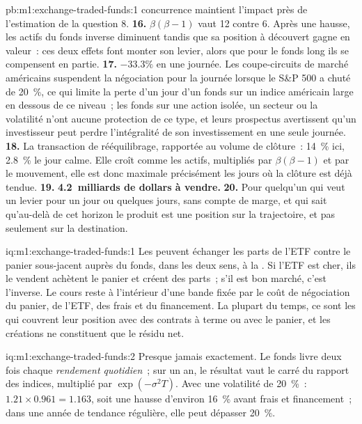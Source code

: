 \begin{solution}{pb:m1:exchange-traded-funds:1}
concurrence maintient l'impact près de l'estimation de la question 8.
\textbf{16.} $\beta(\beta-1)$ vaut 12 contre 6. Après une hausse, les actifs du fonds inverse
diminuent tandis que sa position à découvert gagne en valeur~: ces deux effets font monter
son levier, alors que pour le fonds long ils se compensent en partie.
\textbf{17.} $-33.3\%$ en une journée. Les coupe-circuits de marché américains suspendent
la négociation pour la journée lorsque le S\&P 500 a chuté de 20~\%, ce qui limite la perte
d'un jour d'un fonds sur un indice américain large en dessous de ce niveau~; les fonds sur une action isolée,
un secteur ou la volatilité n'ont aucune protection de ce type, et leurs prospectus avertissent
qu'un investisseur peut perdre l'intégralité de son investissement en une seule journée.
\textbf{18.} La transaction de rééquilibrage, rapportée au volume de clôture~: 14~\% ici,
2.8~\% le jour calme. Elle croît comme les actifs, multipliés par $\beta(\beta-1)$ et par le
mouvement, elle est donc maximale précisément les jours où la clôture
est déjà tendue.
\textbf{19.} \textbf{4.2~milliards de dollars à vendre.}
\textbf{20.} Pour quelqu'un qui veut un levier pour un jour ou quelques jours, sans compte
de marge, et qui sait qu'au-delà de cet horizon le produit est une
position sur la trajectoire, et pas seulement sur la destination.
\end{solution}

\begin{solution}{iq:m1:exchange-traded-funds:1}
Les  peuvent échanger les parts de l'ETF contre le panier sous-jacent
auprès du fonds, dans les deux sens, à la . Si l'ETF est cher, ils le vendent
achètent le panier et créent des parts~; s'il est bon marché, c'est l'inverse. Le cours reste
à l'intérieur d'une bande fixée par le coût de négociation du panier, de l'ETF, des frais et du financement.
La plupart du temps, ce sont les  qui couvrent leur position avec des contrats à terme ou avec le panier,
et les créations ne constituent que le résidu net.
\end{solution}

\begin{solution}{iq:m1:exchange-traded-funds:2}
Presque jamais exactement. Le fonds livre deux fois chaque \emph{rendement quotidien}~; sur un an, le résultat vaut le carré du rapport
des indices, multiplié par $\exp(-\sigma^2 T)$. Avec une volatilité de 20~\%~: $1.21 \times 0.961 = 1.163$, soit
une hausse d'environ 16~\% avant frais et financement~; dans une année
de tendance régulière, elle peut dépasser
20~\%.
\end{solution}

